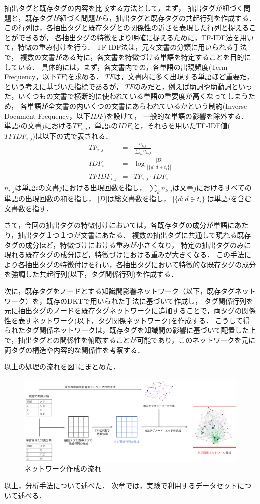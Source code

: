 抽出タグと既存タグの内容を比較する方法として，まず，
抽出タグが紐づく問題と，既存タグが紐づく問題から，抽出タグと既存タグの共起行列を作成する．
この行列は，各抽出タグと既存タグとの関係性の近さを表現した行列と捉えることができるが，
各抽出タグの特徴をより明確に捉えるために，TF-IDF法を用いて，特徴の重み付けを行う．
TF-IDF法は，元々文書の分類に用いられる手法で，
複数の文書がある時に，各文書を特徴づける単語を特定することを目的にしている．
具体的には，まず，各文書内での，各単語の出現頻度(Term Frequency，以下$TF$)を求める．
$TF$は，文書内に多く出現する単語ほど重要だ，という考えに基づいた指標であるが，
$TF$のみだと，例えば助詞や助動詞といった，いくつもの文書で横断的に使われている単語の重要度が高くなってしまうため，
各単語が全文書の内いくつの文書にあらわれているかという制約(Inverse Document Frequency，以下$IDF$)を設けて，
一般的な単語の影響を除外する．
単語$i$の文書$j$における$TF_{i,j}$，単語$i$の$IDF_i$と，それらを用いたTF-IDF値($TFIDF_{i,j}$)は以下の式で表される．
\begin{eqnarray}
TF_{i,j} &=& \frac {n_{i,j}}{\sum _{k}n_{k,j}}
\\
IDF_i &=& \log {\frac {|D|}{|\{d:d\ni t_{i}\}|}}
\\
TFIDF_{i,j} &=& TF_{i,j} \cdot IDF_i
\end{eqnarray}
$n_{i,j}$は単語$i$の文書$j$における出現回数を指し，
$\sum _{k}n_{k,j}$は文書$j$におけるすべての単語の出現回数の和を指し，
$|D|$は総文書数を指し，
$|\{d:d\ni t_{i}\}|$は単語$i$を含む文書数を指す．


さて，今回の抽出タグの特徴付けにおいては，各既存タグの成分が単語にあたり，抽出タグ１つ１つが文書にあたる．
複数の抽出タグに共通して現れる既存タグの成分ほど，特徴づけにおける重みが小さくなり，
特定の抽出タグのみに現れる既存タグの成分ほど，特徴づけにおける重みが大きくなる．
この手法により各抽出タグの特徴付けを行い，各抽出タグにおいて特徴的な既存タグの成分を強調した共起行列(以下，タグ関係行列)を作成する．

次に，既存タグをノードとする知識間影響ネットワーク（以下，既存タグネットワーク）を，既存のDKTで用いられた手法に基づいて作成し，
タグ関係行列を元に抽出タグのノードを既存タグネットワークに追加することで，両タグの関係性を表すネットワーク(以下，タグ関係ネットワーク)を作成する．
こうして得られたタグ関係ネットワークは，既存タグを知識間の影響に基づいて配置した上で，抽出タグとの関係性を俯瞰することが可能であり，このネットワークを元に両タグの構造や内容的な関係性を考察する．

以上の処理の流れを図\ref{fig:networkflow}にまとめた．

\begin{figure}[htb]
\begin{center}
\includegraphics[width=400pt]{./img/networkflow.png}
\end{center}
\caption{ネットワーク作成の流れ}
\label{fig:networkflow}
\end{figure}


\vvspace
以上，分析手法について述べた．
次章では，実験で利用するデータセットについて述べる．


